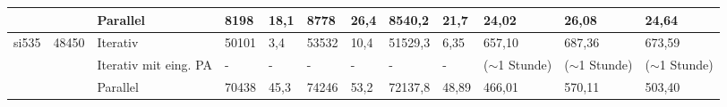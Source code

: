 \documentclass[doktyp=barbeit, sprache=german]{TUBAFarbeiten}
\begin{document}
\begin{landscape}
\begin{table}[]
{\begin{tabular}{@{}llllllllllll@{}}
   &         & \multicolumn{1}{l|}{Parallel}              & 8198    & 18,1     & 8778    & 26,4     & 8540,2       & \multicolumn{1}{l|}{21,7}     & 24,02            & 26,08            & 24,64            \\\midrule
si535     & 48450   & \multicolumn{1}{l|}{Iterativ}              & 50101   & 3,4      & 53532   & 10,4     & 51529,3      & \multicolumn{1}{l|}{6,35}     & 657,10           & 687,36           & 673,59           \\
    &         & \multicolumn{1}{l|}{Iterativ mit eing. PA} & -       & -        & -       & -        & -            & \multicolumn{1}{l|}{-}        & ($\sim$1 Stunde) & ($\sim$1 Stunde) & ($\sim$1 Stunde) \\
          &         & \multicolumn{1}{l|}{Parallel}              & 70438   & 45,3     & 74246   & 53,2     & 72137,8      & \multicolumn{1}{l|}{48,89}    & 466,01           & 570,11           & 503,40           \\  \bottomrule
\end{tabular}%
}
\end{table}
\end{landscape}
\end{document}
